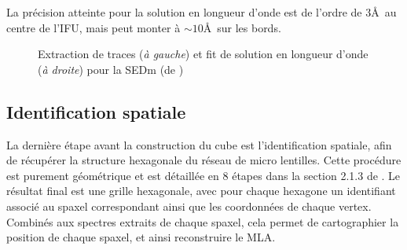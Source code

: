\documentclass[../main/main.tex]{subfiles}
\begin{document}
La précision atteinte pour la solution en longueur d'onde est de l'ordre
de $3$\AA\ au centre de l'IFU, mais peut monter à $\sim10$\AA\ sur les bords.

\begin{figure}[ht]
\centering
{}\hfill
{}
\caption[Extraction de traces et solution en longueur
d'onde pour la
SEDm]{Extraction de traces (\textit{à gauche}) et fit de solution en longueur
  d'onde (\textit{à droite}) pour la SEDm
  (de \citet{pysedm})}
\label{fig:calibsedm}
\end{figure}

\subsection{Identification spatiale}\label{ssec:spaceid}
La dernière étape avant la construction du cube est l'identification
spatiale, afin de récupérer la structure hexagonale du réseau de micro
lentilles.
Cette procédure est purement géométrique et est détaillée en 8 étapes
dans la section 2.1.3 de \citet{pysedm}. Le résultat final est une
grille hexagonale, avec pour chaque hexagone un identifiant associé au
spaxel correspondant ainsi que les coordonnées de chaque vertex.
Combinés aux spectres extraits de chaque spaxel, cela permet de
cartographier la position de chaque spaxel, et ainsi reconstruire le
MLA.
\end{document}
